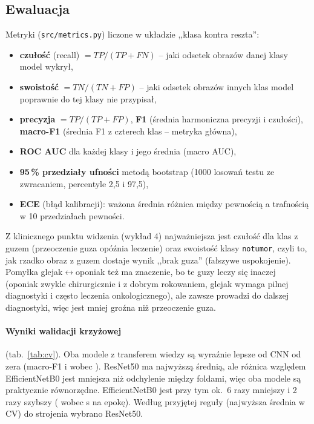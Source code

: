 \subsection*{Ewaluacja}
Metryki (\texttt{src/metrics.py}) liczone w układzie ,,klasa kontra reszta'':
\begin{itemize}
\item \textbf{czułość} (recall) $= TP/(TP+FN)$ -- jaki odsetek obrazów danej klasy model wykrył,
\item \textbf{swoistość} $= TN/(TN+FP)$ -- jaki odsetek obrazów innych klas model poprawnie
  do tej klasy nie przypisał,
\item \textbf{precyzja} $= TP/(TP+FP)$, \textbf{F1} (średnia harmoniczna precyzji i czułości),
  \textbf{macro-F1} (średnia F1 z czterech klas -- metryka główna),
\item \textbf{ROC AUC} dla każdej klasy i jego średnia (macro AUC),
\item \textbf{95\,\% przedziały ufności} metodą bootstrap (1000 losowań testu ze zwracaniem,
  percentyle 2,5 i 97,5),
\item \textbf{ECE} (błąd kalibracji): ważona średnia różnica między pewnością a trafnością
  w 10 przedziałach pewności.
\end{itemize}
Z klinicznego punktu widzenia (wykład 4) najważniejsza jest czułość dla klas z guzem
(przeoczenie guza opóźnia leczenie) oraz swoistość klasy \texttt{notumor}, czyli to, jak rzadko
obraz z guzem dostaje wynik ,,brak guza'' (fałszywe uspokojenie). Pomyłka glejak$\leftrightarrow$oponiak
też ma znaczenie, bo te guzy leczy się inaczej (oponiak zwykle chirurgicznie i z dobrym
rokowaniem, glejak wymaga pilnej diagnostyki i często leczenia onkologicznego), ale zawsze
prowadzi do dalszej diagnostyki, więc jest mniej groźna niż przeoczenie guza.

\paragraph{Wyniki walidacji krzyżowej} (tab.~\ref{tab:cv}). Oba modele z transferem wiedzy
są wyraźnie lepsze od CNN od zera (macro-F1 \cvFEff{} i \cvFRes{} wobec \cvFCnn{}). ResNet50
ma najwyższą średnią, ale różnica względem EfficientNetB0 jest mniejsza niż odchylenie
między foldami, więc oba modele są praktycznie równorzędne. EfficientNetB0 jest przy tym
ok.~6 razy mniejszy i 2 razy szybszy (\cvSecEff{} wobec \cvSecRes{} s na epokę).
Według przyjętej reguły (najwyższa średnia w CV) do strojenia wybrano ResNet50.


